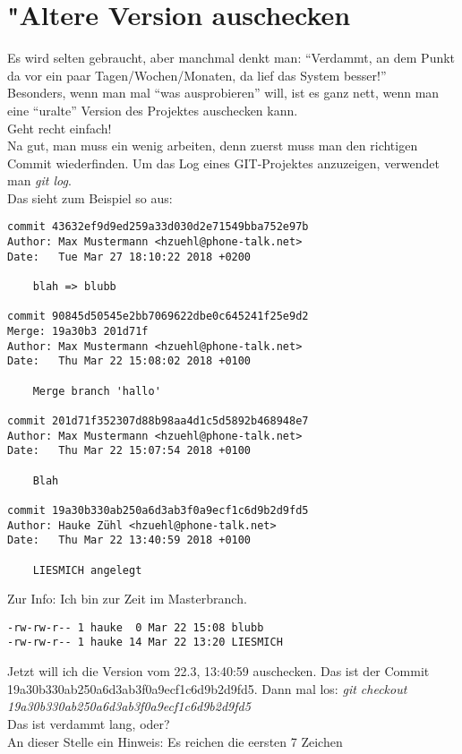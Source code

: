 \documentclass[german,a4paper]{report}
\begin{document}
\chapter{"Altere Version auschecken}
Es wird selten gebraucht, aber manchmal denkt man: ``Verdammt,
an dem Punkt da vor ein paar Tagen/Wochen/Monaten, da lief
das System besser!''\\
Besonders, wenn man mal ``was ausprobieren'' will, ist es
ganz nett, wenn man eine ``uralte'' Version des Projektes
auschecken kann.\\
Geht recht einfach!\\
Na gut, man muss ein wenig arbeiten, denn zuerst muss man
den richtigen Commit wiederfinden. Um das Log eines GIT-Projektes
anzuzeigen, verwendet man \textit{git log}.\\
Das sieht zum Beispiel so aus:
\begin{verbatim}
commit 43632ef9d9ed259a33d030d2e71549bba752e97b
Author: Max Mustermann <hzuehl@phone-talk.net>
Date:   Tue Mar 27 18:10:22 2018 +0200

    blah => blubb

commit 90845d50545e2bb7069622dbe0c645241f25e9d2
Merge: 19a30b3 201d71f
Author: Max Mustermann <hzuehl@phone-talk.net>
Date:   Thu Mar 22 15:08:02 2018 +0100

    Merge branch 'hallo'

commit 201d71f352307d88b98aa4d1c5d5892b468948e7
Author: Max Mustermann <hzuehl@phone-talk.net>
Date:   Thu Mar 22 15:07:54 2018 +0100

    Blah

commit 19a30b330ab250a6d3ab3f0a9ecf1c6d9b2d9fd5
Author: Hauke Zühl <hzuehl@phone-talk.net>
Date:   Thu Mar 22 13:40:59 2018 +0100

    LIESMICH angelegt
\end{verbatim}
Zur Info: Ich bin zur Zeit im Masterbranch.\\
\begin{verbatim}
-rw-rw-r-- 1 hauke  0 Mar 22 15:08 blubb
-rw-rw-r-- 1 hauke 14 Mar 22 13:20 LIESMICH
\end{verbatim}
Jetzt will ich die Version vom 22.3, 13:40:59 auschecken.
Das ist der Commit\\
19a30b330ab250a6d3ab3f0a9ecf1c6d9b2d9fd5.
Dann mal los: \textit{git checkout\\
19a30b330ab250a6d3ab3f0a9ecf1c6d9b2d9fd5}\\
Das ist verdammt lang, oder?\\
An dieser Stelle ein Hinweis: Es reichen die eersten 7 Zeichen
\end{document}

